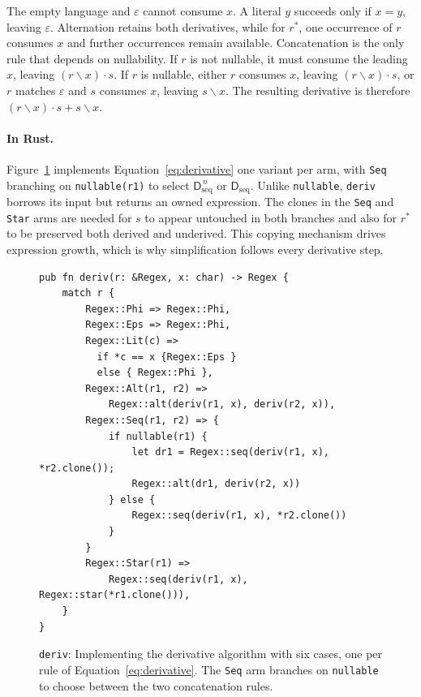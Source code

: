 The empty language and \(\varepsilon\) cannot consume \(x\). 
A literal \(y\) succeeds only if \(x=y\), leaving \(\varepsilon\). 
Alternation retains both derivatives, while for \(r^{*}\), 
one occurrence of \(r\) consumes \(x\) and further occurrences remain available.
Concatenation is the only rule that depends on nullability. 
If \(r\) is not nullable, it must consume the leading \(x\), 
leaving \((r\backslash x)\cdot s\). 
If \(r\) is nullable, either \(r\) consumes \(x\), 
leaving \((r\backslash x)\cdot s\), 
or \(r\) matches \(\varepsilon\) and \(s\) consumes \(x\), 
leaving \(s\backslash x\). 
The resulting derivative is therefore \((r\backslash x)\cdot s + s\backslash x\).

%

\paragraph{In Rust.}
Figure~\ref{fig:deriv-rust} implements Equation~\eqref{eq:derivative} 
one variant per arm,  with \texttt{Seq} branching on \texttt{nullable(r1)} 
to select $\mathsf{D}_{\mathrm{seq}}^{\,n}$ or $\mathsf{D}_{\mathrm{seq}}$. 
Unlike \texttt{nullable}, \texttt{deriv} borrows its input 
but returns an owned expression. 
The clones in the \texttt{Seq} and \texttt{Star} arms are needed for $s$ 
to appear untouched in both branches 
and also for $r^{*}$ to be preserved both derived and underived. 
This copying mechanism drives expression growth,
which is why simplification follows every derivative step.

\begin{figure}[H]
\small
\begin{verbatim}
pub fn deriv(r: &Regex, x: char) -> Regex {
    match r {
        Regex::Phi => Regex::Phi,
        Regex::Eps => Regex::Phi,
        Regex::Lit(c) => 
          if *c == x {Regex::Eps } 
          else { Regex::Phi },
        Regex::Alt(r1, r2) => 
            Regex::alt(deriv(r1, x), deriv(r2, x)),
        Regex::Seq(r1, r2) => {
            if nullable(r1) {
                let dr1 = Regex::seq(deriv(r1, x), *r2.clone());
                Regex::alt(dr1, deriv(r2, x))
            } else {
                Regex::seq(deriv(r1, x), *r2.clone())
            }
        }
        Regex::Star(r1) => 
            Regex::seq(deriv(r1, x), Regex::star(*r1.clone())),
    }
}
\end{verbatim}
\caption{\texttt{deriv}: Implementing the derivative algorithm with six cases, 
one per rule of Equation~\eqref{eq:derivative}.
The \texttt{Seq} arm branches on \texttt{nullable} 
to choose between the two concatenation rules.}
\label{fig:deriv-rust}
\end{figure}

